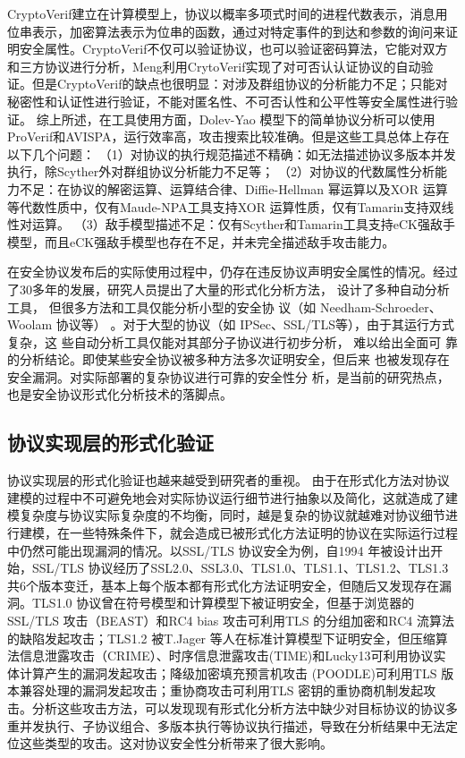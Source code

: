CryptoVerif建立在计算模型上，协议以概率多项式时间的进程代数表示，消息用位串表示，加密算法表示为位串的函数，通过对特定事件的到达和参数的询问来证明安全属性。CryptoVerif不仅可以验证协议，也可以验证密码算法，它能对双方和三方协议进行分析，Meng利用CrytoVerif实现了对可否认认证协议的自动验证\cite{Meng2011}。但是CryptoVerif的缺点也很明显：对涉及群组协议的分析能力不足；只能对秘密性和认证性进行验证，不能对匿名性、不可否认性和公平性等安全属性进行验证。
综上所述，在工具使用方面，Dolev-Yao 模型下的简单协议分析可以使用ProVerif和AVISPA，运行效率高，攻击搜索比较准确。但是这些工具总体上存在以下几个问题：
（1）对协议的执行规范描述不精确：如无法描述协议多版本并发执行，除Scyther外对群组协议分析能力不足等；
（2）对协议的代数属性分析能力不足：在协议的解密运算、运算结合律、Diffie-Hellman 幂运算以及XOR 运算等代数性质中，仅有Maude-NPA工具支持XOR 运算性质，仅有Tamarin支持双线性对运算。
（3）敌手模型描述不足：仅有Scyther和Tamarin工具支持eCK强敌手模型，而且eCK强敌手模型也存在不足，并未完全描述敌手攻击能力。


在安全协议发布后的实际使用过程中，仍存在违反协议声明安全属性的情况\cite{toolsverify}。经过了30多年的发展，研究人员提出了大量的形式化分析方法，
设计了多种自动分析工具， 但很多方法和工具仅能分析小型的安全协
议（如 Needham-Schroeder、Woolam 协议等） 。对于大型的协议（如 IPSec、SSL/TLS等），由于其运行方式复杂，这
些自动分析工具仅能对其部分子协议进行初步分析， 难以给出全面可
靠的分析结论。即使某些安全协议被多种方法多次证明安全，但后来
也被发现存在安全漏洞。对实际部署的复杂协议进行可靠的安全性分
析，是当前的研究热点，也是安全协议形式化分析技术的落脚点。

\subsection{协议实现层的形式化验证}

协议实现层的形式化验证也越来越受到研究者的重视。
由于在形式化方法对协议建模的过程中不可避免地会对实际协议运行细节进行抽象以及简化，这就造成了建模复杂度与协议实际复杂度的不均衡，同时，越是复杂的协议就越难对协议细节进行建模，在一些特殊条件下，就会造成已被形式化方法证明的协议在实际运行过程中仍然可能出现漏洞的情况。以SSL/TLS 协议安全为例，自1994 年被设计出开始，SSL/TLS 协议经历了SSL2.0、SSL3.0、TLS1.0、TLS1.1、TLS1.2、TLS1.3共6个版本变迁，基本上每个版本都有形式化方法证明安全，但随后又发现存在漏洞。TLS1.0 协议曾在符号模型和计算模型下被证明安全\cite{Meyer2013}\cite{Ray2009}，但基于浏览器的SSL/TLS 攻击（BEAST）\cite{Duong2011}和RC4 bias 攻击\cite{AlFardan2013b}可利用TLS 的分组加密和RC4 流算法的缺陷发起攻击；TLS1.2 被T.Jager 等人在标准计算模型下证明安全\cite{Jager2012}，但压缩算法信息泄露攻击（CRIME）、时序信息泄露攻击(TIME)\cite{Malhotra2016}和Lucky13\cite{AlFardan2013}可利用协议实体计算产生的漏洞发起攻击；降级加密填充预言机攻击 (POODLE)\cite{Moller2014}可利用TLS 版本兼容处理的漏洞发起攻击；重协商攻击可利用TLS 密钥的重协商机制发起攻击。分析这些攻击方法，可以发现现有形式化分析方法中缺少对目标协议的协议多重并发执行、子协议组合、多版本执行等协议执行描述，导致在分析结果中无法定位这些类型的攻击。这对协议安全性分析带来了很大影响。

